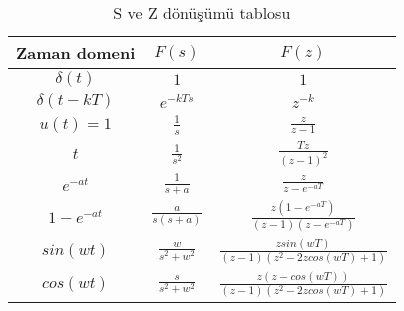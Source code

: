 \setlength{\tabcolsep}{40pt}
\begin{table}[!htb]
    \centering
    \caption{S ve Z dönüşümü tablosu}
    \label{tbl:ztransform1}
    \begin{tabularx}{\textwidth}{ccc}\hline
        Zaman domeni& $F(s)$& $F(z)$\\[5pt]\hline
        $\delta(t)$& $1$& $1$\\[5pt]
        $\delta(t-kT)$& $e^{-kTs}$& $z^{-k}$\\[5pt]
        $u(t)=1$& $\frac{1}{s}$& $\frac{z}{z-1}$\\[5pt]
        $t$& $\frac{1}{s^2}$& $\frac{Tz}{(z-1)^2}$\\[5pt]
        $e^{-at}$& $\frac{1}{s+a}$& $\frac{z}{z-e^{-aT}}$\\[5pt]
        $1-e^{-at}$& $\frac{a}{s(s+a)}$& $\frac{z(1-e^{-aT})}{(z-1)(z-e^{-aT})}$\\[5pt]
        $sin(wt)$& $\frac{w}{s^2+w^2}$& $\frac{zsin(wT)}{(z-1)(z^2-2zcos(wT)+1)}$\\[5pt]
        $cos(wt)$& $\frac{s}{s^2+w^2}$& $\frac{z(z-cos(wT))}{(z-1)(z^2-2zcos(wT)+1)}$\\[5pt]\hline
    \end{tabularx}
\end{table}